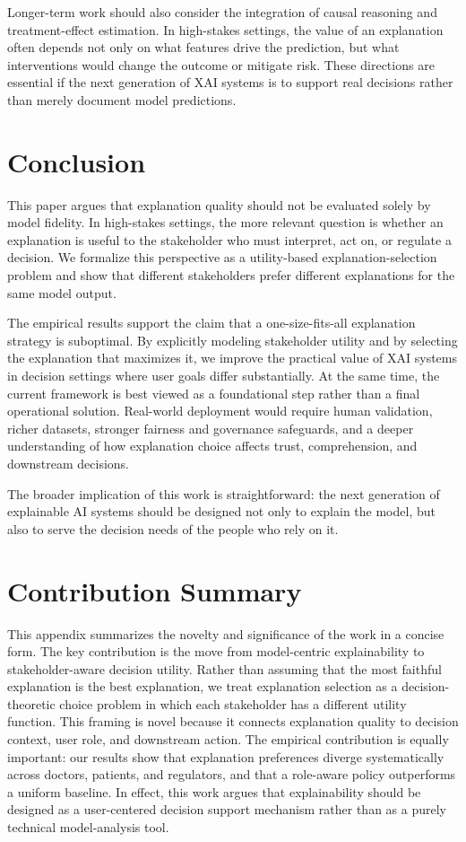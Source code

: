 \documentclass{article}
\begin{document}
Longer-term work should also consider the integration of causal reasoning and treatment-effect estimation. In high-stakes settings, the value of an explanation often depends not only on what features drive the prediction, but what interventions would change the outcome or mitigate risk. These directions are essential if the next generation of XAI systems is to support real decisions rather than merely document model predictions.

\section{Conclusion}

This paper argues that explanation quality should not be evaluated solely by model fidelity. In high-stakes settings, the more relevant question is whether an explanation is useful to the stakeholder who must interpret, act on, or regulate a decision. We formalize this perspective as a utility-based explanation-selection problem and show that different stakeholders prefer different explanations for the same model output.

The empirical results support the claim that a one-size-fits-all explanation strategy is suboptimal. By explicitly modeling stakeholder utility and by selecting the explanation that maximizes it, we improve the practical value of XAI systems in decision settings where user goals differ substantially. At the same time, the current framework is best viewed as a foundational step rather than a final operational solution. Real-world deployment would require human validation, richer datasets, stronger fairness and governance safeguards, and a deeper understanding of how explanation choice affects trust, comprehension, and downstream decisions.

The broader implication of this work is straightforward: the next generation of explainable AI systems should be designed not only to explain the model, but also to serve the decision needs of the people who rely on it.

\appendix
\section{Contribution Summary}

This appendix summarizes the novelty and significance of the work in a concise form. The key contribution is the move from model-centric explainability to stakeholder-aware decision utility. Rather than assuming that the most faithful explanation is the best explanation, we treat explanation selection as a decision-theoretic choice problem in which each stakeholder has a different utility function. This framing is novel because it connects explanation quality to decision context, user role, and downstream action. The empirical contribution is equally important: our results show that explanation preferences diverge systematically across doctors, patients, and regulators, and that a role-aware policy outperforms a uniform baseline. In effect, this work argues that explainability should be designed as a user-centered decision support mechanism rather than as a purely technical model-analysis tool.
\end{document}
